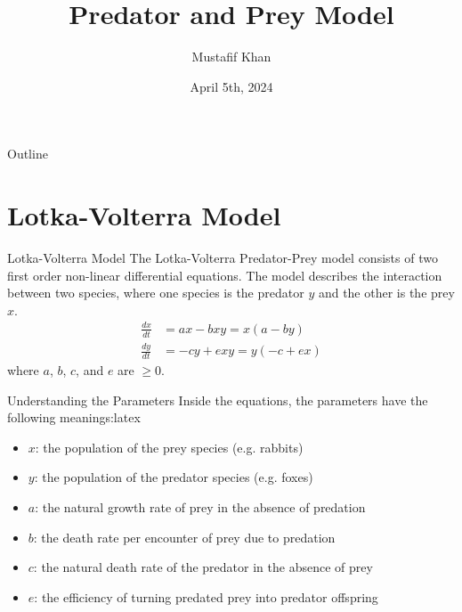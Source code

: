 \documentclass[10pt]{beamer}
\title[Predator and Prey Model]{Predator and Prey Model}
\author[Mustafif Khan]{Mustafif Khan}
\institute[TMU]{MTH630-W2024}
\date{April 5th, 2024}
\begin{document}
\begin{frame}
    \titlepage
\end{frame}

\begin{frame}{Outline}
    \tableofcontents
\end{frame}

\section{Lotka-Volterra Model}
\begin{frame}{Lotka-Volterra Model}
    The Lotka-Volterra Predator-Prey model consists of two first order
    non-linear differential equations. The model describes the interaction
    between
    two species, where one species is the predator $y$ and the other is the
    prey
    $x$.
    \begin{align}
        \frac{dx}{dt} & = ax - bxy = x(a-by)     \\
        \frac{dy}{dt} & = -cy + exy = y(-c + ex)
    \end{align}
    where $a$, $b$, $c$, and $e$ are $\geq 0$.
\end{frame}

\begin{frame}{Understanding the Parameters}
    Inside the equations, the parameters have the following meanings:latex

    \begin{itemize}
        \item $x$: the population of the prey species (e.g. rabbits)
        \item $y$: the population of the predator species (e.g. foxes)
        \item $a$: the natural growth rate of prey in the absence of predation
        \item $b$: the death rate per encounter of prey due to predation
        \item $c$: the natural death rate of the predator in the absence of
              prey
        \item $e$: the efficiency of turning predated prey into predator
              offspring
    \end{itemize}
\end{frame}
\end{document}
